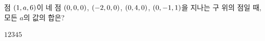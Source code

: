 점 $(1{,}\mkern3mu\mathopen{}a{,}\mkern3mu\mathopen{}6)$이 네 점 $(0{,}\mkern3mu\mathopen{}0{,}\mkern3mu\mathopen{}0)$, $(-2{,}\mkern3mu\mathopen{}0{,}\mkern3mu\mathopen{}0)$, $(0{,}\mkern3mu\mathopen{}4{,}\mkern3mu\mathopen{}0)$, $(0{,}\mkern3mu\mathopen{}-1{,}\mkern3mu\mathopen{}1)$을 지나는 구 위의 점일 때, 모든 $a$의 값의 합은?
\begin{choices32}{$1$}{$2$}{$3$}{$4$}{$5$}\end{choices32}
